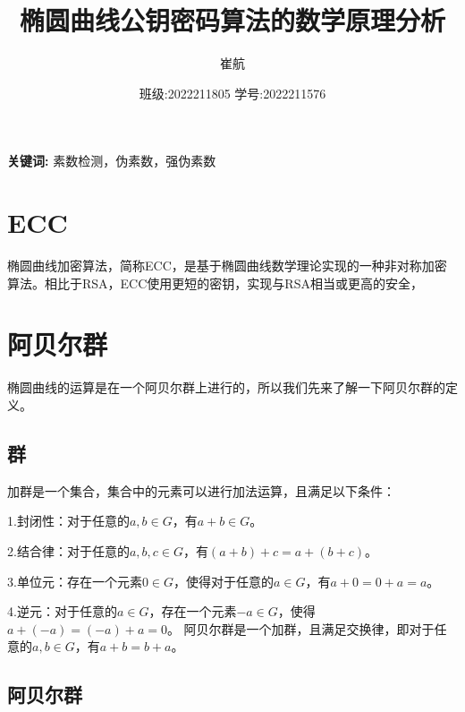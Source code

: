 \documentclass[a4paper]{article}
\title{\heiti\zihao{3} 椭圆曲线公钥密码算法的数学原理分析}
\date{班级:2022211805 学号:2022211576}
\author{\songti 崔航}
\providecommand{\keywords}[1]
{
    \small	
    \textbf{关键词:} #1
}
\providecommand{\keywords}[1]
{
  \small	
  \textbf{关键词:} #1
}
\begin{document}
    \maketitle
\begin{abstract}

\end{abstract}
\keywords{素数检测，伪素数，强伪素数}
\tableofcontents
\section{ECC}
椭圆曲线加密算法，简称ECC，是基于椭圆曲线数学理论实现的一种非对称加密算法。相比于RSA，ECC使用更短的密钥，实现与RSA相当或更高的安全，
\section{阿贝尔群}
椭圆曲线的运算是在一个阿贝尔群上进行的，所以我们先来了解一下阿贝尔群的定义。
\subsection{群}
加群是一个集合，集合中的元素可以进行加法运算，且满足以下条件：
\item 1.封闭性：对于任意的$a,b\in G$，有$a+b\in G$。
\item 2.结合律：对于任意的$a,b,c\in G$，有$(a+b)+c=a+(b+c)$。
\item 3.单位元：存在一个元素$0\in G$，使得对于任意的$a\in G$，有$a+0=0+a=a$。
\item 4.逆元：对于任意的$a\in G$，存在一个元素$-a\in G$，使得$a+(-a)=(-a)+a=0$。
阿贝尔群是一个加群，且满足交换律，即对于任意的$a,b\in G$，有$a+b=b+a$。


\subsection{阿贝尔群}



\begin{thebibliography}{1000}  
    
\end{thebibliography}
\end{document}
